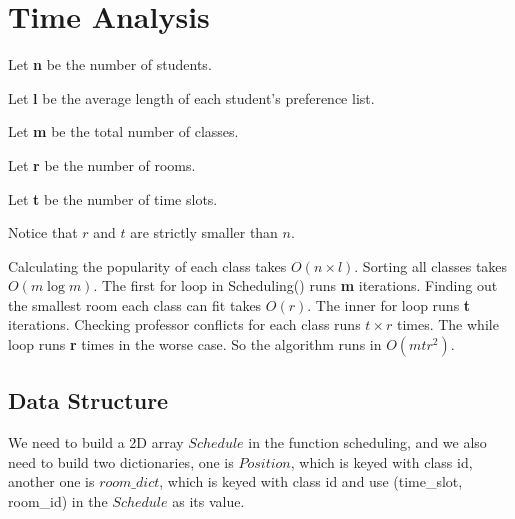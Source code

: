 \documentclass[11pt, oneside]{article}   	%
\begin{document}
\begin{algorithm}[H]
\end{algorithm}

\section{Time Analysis}
Let \textbf{n} be the number of students. 

Let \textbf{l} be the average length of each student's preference list.

Let \textbf{m} be the total number of classes. 

Let \textbf{r} be the number of rooms. 

Let \textbf{t} be the number of time slots. 

Notice that $r$ and $t$ are strictly smaller than $n$.

Calculating the popularity of each class takes $O(n \times l)$. Sorting all classes takes $O(m\log m)$. The first for loop in Scheduling() runs \textbf{m} iterations. Finding out the smallest room each class can fit takes $O(r)$. The inner for loop runs \textbf{t} iterations. Checking professor conflicts for each class runs $t \times r$ times. The while loop runs \textbf{r} times in the worse case. So the algorithm runs in $O(mtr^2)$.

\subsection{Data Structure}
We need to build a 2D array $Schedule$ in the function scheduling, and we also need to build two dictionaries, one is $Position$, which is keyed with class id, another one is $room\_dict$, which is keyed with class id and use (time\_slot, room\_id) in the $Schedule$ as its value. 
\end{document}
